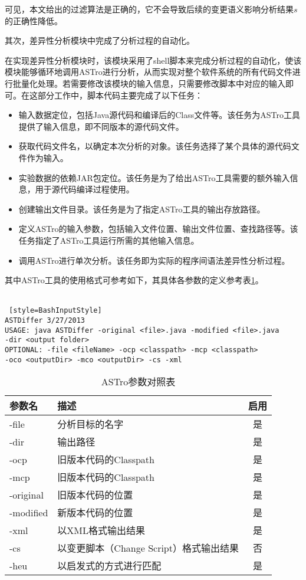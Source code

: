可见，本文给出的过滤算法是正确的，它不会导致后续的变更语义影响分析结果$s$的正确性降低。

其次，差异性分析模块中完成了分析过程的自动化。

在实现差异性分析模块时，该模块采用了shell脚本来完成分析过程的自动化，使该模块能够循环地调用ASTro进行分析，从而实现对整个软件系统的所有代码文件进行批量化处理。若需要修改该模块的输入信息，只需要修改脚本中对应的输入即可。在这部分工作中，脚本代码主要完成了以下任务：

\begin{itemize}
	\item 输入数据定位，包括Java源代码和编译后的Class文件等。该任务为ASTro工具提供了输入信息，即不同版本的源代码文件。
	\item 获取代码文件名，以确定本次分析的对象。该任务选择了某个具体的源代码文件作为输入。
	\item 实验数据的依赖JAR包定位。该任务是为了给出ASTro工具需要的额外输入信息，用于源代码编译过程使用。
	\item 创建输出文件目录。该任务是为了指定ASTro工具的输出存放路径。
	\item 定义ASTro的输入参数，包括输入文件位置、输出文件位置、查找路径等。该任务指定了ASTro工具运行所需的其他输入信息。
	\item 调用ASTro进行单次分析。该任务即为实际的程序间语法差异性分析过程。
\end{itemize}

其中ASTro工具的使用格式可参考如下，其具体各参数的定义参考表\ref {ASTro}。\\\\
\begin{lstlisting} [style=BashInputStyle]
ASTDiffer 3/27/2013
USAGE: java ASTDiffer -original <file>.java -modified <file>.java 
-dir <output folder>
OPTIONAL: -file <fileName> -ocp <classpath> -mcp <classpath> 
-oco <outputDir> -mco <outputDir> -cs -xml
\end{lstlisting}	

\begin{table}[H]
	\caption{ASTro参数对照表}
	\label{ASTro}
	\centering
	\begin{tabular}{llc}
		\toprule[1.5pt] 
		{\heiti 参数名} & {\heiti 描述} & {\heiti 启用}\\\midrule[1pt]
		-file & 分析目标的名字 & 是 \\
		-dir & 输出路径 & 是 \\
		-ocp & 旧版本代码的Classpath & 是\\
		-mcp & 旧版本代码的Classpath & 是\\
		-original    & 旧版本代码的位置 & 是\\
		-modified   & 新版本代码的位置 & 是\\
		-xml   & 以XML格式输出结果 & 是\\
		-cs   & 以变更脚本（Change Script）格式输出结果 & 否\\
		-heu   & 以启发式的方式进行匹配 & 是\\
		\bottomrule[1.5pt]
	\end{tabular}	
\end{table}

